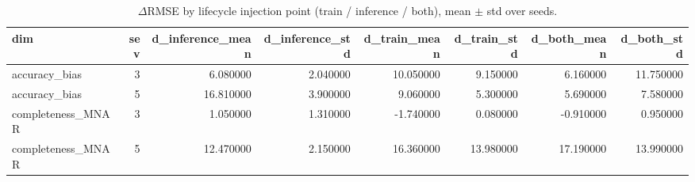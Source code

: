 \begin{table}
\caption{$\Delta$RMSE by lifecycle injection point (train / inference / both), mean $\pm$ std over seeds.}
\label{tab:F_injection_points}
\begin{tabular}{lrrrrrrr}
\toprule
dim & sev & d_inference_mean & d_inference_std & d_train_mean & d_train_std & d_both_mean & d_both_std \\
\midrule
accuracy\_bias & 3 & 6.080000 & 2.040000 & 10.050000 & 9.150000 & 6.160000 & 11.750000 \\
accuracy\_bias & 5 & 16.810000 & 3.900000 & 9.060000 & 5.300000 & 5.690000 & 7.580000 \\
completeness\_MNAR & 3 & 1.050000 & 1.310000 & -1.740000 & 0.080000 & -0.910000 & 0.950000 \\
completeness\_MNAR & 5 & 12.470000 & 2.150000 & 16.360000 & 13.980000 & 17.190000 & 13.990000 \\
\bottomrule
\end{tabular}
\end{table}
